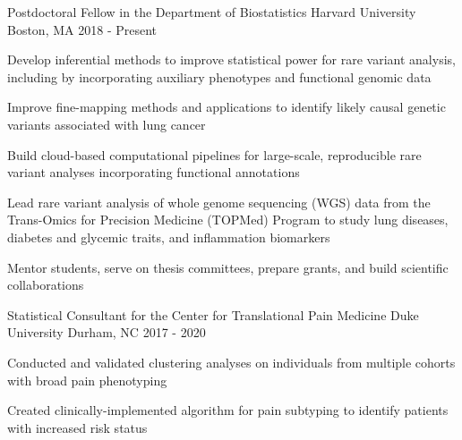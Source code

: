 

\begin{cventries}
\cventry
{Postdoctoral Fellow in the Department of Biostatistics} %
{Harvard University} %
{Boston, MA} %
{2018 - Present} %
{
	\begin{cvitems} %
		\item {Develop inferential methods to improve statistical power for rare variant analysis, including by incorporating auxiliary phenotypes and functional genomic data}
		\item {Improve fine-mapping methods and applications to identify likely causal genetic variants  associated with lung cancer}
		\item {Build cloud-based computational pipelines for large-scale, reproducible rare variant analyses incorporating functional annotations}
		\item {Lead rare variant analysis of whole genome sequencing (WGS) data from the Trans-Omics for Precision Medicine (TOPMed) Program to study lung diseases, diabetes and glycemic traits, and inflammation biomarkers}
		\item {Mentor students, serve on thesis committees, prepare grants, and build scientific collaborations}
	\end{cvitems}
}


  \cventry
    {Statistical Consultant for the Center for Translational Pain Medicine} %
    {Duke University} %
    {Durham, NC} %
    {2017 - 2020} %
    {
      \begin{cvitems} %
        \item {Conducted and validated clustering analyses on individuals from multiple cohorts with broad pain phenotyping}
        \item {Created clinically-implemented algorithm for pain subtyping to identify patients with increased risk status}
      \end{cvitems}
    }


\end{cventries}

